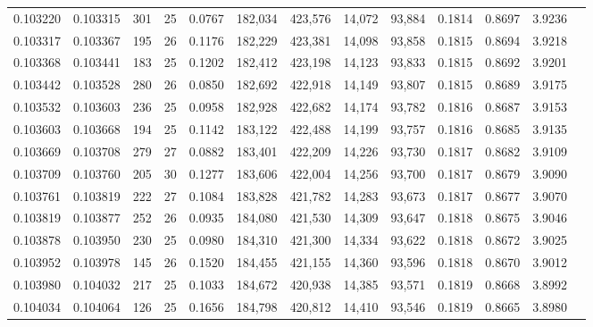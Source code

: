 \begin{tabular}{rrrrrrrrrrrrr}
0.103220 & 0.103315 & 301 &  25 &                                     0.0767 & 182,034 & 423,576 &  14,072 &  93,884 & 0.1814 & 0.8697 & 3.9236 \\
0.103317 & 0.103367 & 195 &  26 &                                     0.1176 & 182,229 & 423,381 &  14,098 &  93,858 & 0.1815 & 0.8694 & 3.9218 \\
0.103368 & 0.103441 & 183 &  25 &                                     0.1202 & 182,412 & 423,198 &  14,123 &  93,833 & 0.1815 & 0.8692 & 3.9201 \\
0.103442 & 0.103528 & 280 &  26 &                                     0.0850 & 182,692 & 422,918 &  14,149 &  93,807 & 0.1815 & 0.8689 & 3.9175 \\
0.103532 & 0.103603 & 236 &  25 &                                     0.0958 & 182,928 & 422,682 &  14,174 &  93,782 & 0.1816 & 0.8687 & 3.9153 \\
0.103603 & 0.103668 & 194 &  25 &                                     0.1142 & 183,122 & 422,488 &  14,199 &  93,757 & 0.1816 & 0.8685 & 3.9135 \\
0.103669 & 0.103708 & 279 &  27 &                                     0.0882 & 183,401 & 422,209 &  14,226 &  93,730 & 0.1817 & 0.8682 & 3.9109 \\
0.103709 & 0.103760 & 205 &  30 &                                     0.1277 & 183,606 & 422,004 &  14,256 &  93,700 & 0.1817 & 0.8679 & 3.9090 \\
0.103761 & 0.103819 & 222 &  27 &                                     0.1084 & 183,828 & 421,782 &  14,283 &  93,673 & 0.1817 & 0.8677 & 3.9070 \\
0.103819 & 0.103877 & 252 &  26 &                                     0.0935 & 184,080 & 421,530 &  14,309 &  93,647 & 0.1818 & 0.8675 & 3.9046 \\
0.103878 & 0.103950 & 230 &  25 &                                     0.0980 & 184,310 & 421,300 &  14,334 &  93,622 & 0.1818 & 0.8672 & 3.9025 \\
0.103952 & 0.103978 & 145 &  26 &                                     0.1520 & 184,455 & 421,155 &  14,360 &  93,596 & 0.1818 & 0.8670 & 3.9012 \\
0.103980 & 0.104032 & 217 &  25 &                                     0.1033 & 184,672 & 420,938 &  14,385 &  93,571 & 0.1819 & 0.8668 & 3.8992 \\
0.104034 & 0.104064 & 126 &  25 &                                     0.1656 & 184,798 & 420,812 &  14,410 &  93,546 & 0.1819 & 0.8665 & 3.8980 \\

\end{tabular}
